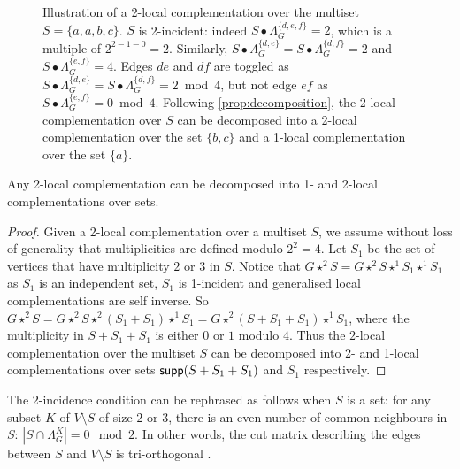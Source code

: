 \documentclass[a4paper,UKenglish,cleveref,autoref,thm-restate]{arxiv}
\newcommand{\supp}{\textup{\textsf{supp}}}
\begin{document}
\begin{figure}[h]
    \caption{Illustration of a 2-local complementation over the multiset $S = \{a,a,b,c\}$. $S$ is 2-incident: indeed $S\bullet \Lambda_G^{\{d,e,f\}} = 2$, which is a multiple of $2^{2-1-0} = 2$. Similarly, $S\bullet \Lambda_G^{\{d,e\}} = S\bullet \Lambda_G^{\{d,f\}} = 2$ and $S\bullet \Lambda_G^{\{e,f\}} = 4$. Edges $de$ and $df$ are toggled as $S\bullet \Lambda_G^{\{d,e\}} = S\bullet \Lambda_G^{\{d,f\}} = 2\bmod 4$, but not edge $ef$ as $S\bullet \Lambda_G^{\{e,f\}} = 0\bmod 4$. Following \cref{prop:decomposition}, the 2-local complementation over $S$ can be decomposed into a 2-local complementation over the set $\{b,c\}$ and a 1-local complementation over the set $\{a\}$.}
    \label{fig:generalized_lc}    
    \end{figure}

\begin{proposition} \label{prop:decomposition}
Any 2-local complementation can be decomposed into 1- and 2-local complementations over sets.
\end{proposition}
\begin{proof}
    Given a 2-local complementation over a multiset $S$, we assume without loss of generality that multiplicities are defined modulo $2^2 = 4$. Let  $S_1$ be the set of vertices that have multiplicity $2$ or $3$ in $S$. Notice that $G\star^2 S = G\star^2 S\star^1 S_1\star^1 S_1$ as $S_1$ is an independent set, $S_1$ is 1-incident and generalised local complementations are self inverse. So $G\star^2 S = G\star^2 S\star^2 (S_1 + S_1)\star^1 S_1 = G\star^2(S+ S_1 + S_1)\star^1 S_1$, where the multiplicity in $S+ S_1 + S_1$ is either $0$ or $1$ modulo $4$. Thus the $2$-local complementation over the multiset $S$ can be decomposed into 2- and 1-local complementations over sets $\supp(S+ S_1+S_1)$ and $S_1$ respectively. 
\end{proof}

  
The 2-incidence condition can be rephrased as follows when $S$ is a set: for any subset $K$ of $V\setminus S$ of size $2$ or $3$, there is an even number of common neighbours in $S$: $|S\cap \Lambda_G^K|=0\mod 2$. In other words, the cut matrix describing the edges between $S$ and $V\setminus S$ is tri-orthogonal \cite{bravyi2012magic, shi2024, nezami2022}.  
\end{document}

